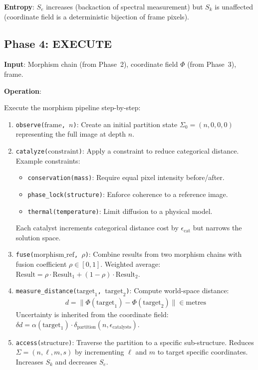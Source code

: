 \documentclass[11pt,twocolumn]{article}
\begin{document}
\textbf{Entropy}: $S_e$ increases (backaction of spectral measurement) but $S_k$ is unaffected (coordinate field is a deterministic bijection of frame pixels).

\subsection{Phase 4: EXECUTE}

\textbf{Input}: Morphism chain (from Phase~2), coordinate field $\Phi$ (from Phase~3), frame.

\textbf{Operation}:

Execute the morphism pipeline step-by-step:

\begin{enumerate}
\item \texttt{observe($\text{frame}$, $n$)}: Create an initial partition state $\Sigma_0 = (n, 0, 0, 0)$ representing the full image at depth $n$.
\item \texttt{catalyze($\text{constraint}$)}: Apply a constraint to reduce categorical distance. Example constraints:
  \begin{itemize}
  \item \texttt{conservation(mass)}: Require equal pixel intensity before/after.
  \item \texttt{phase\_lock(structure)}: Enforce coherence to a reference image.
  \item \texttt{thermal(temperature)}: Limit diffusion to a physical model.
  \end{itemize}
  Each catalyst increments categorical distance cost by $\epsilon_{\text{cat}}$ but narrows the solution space.

\item \texttt{fuse($\text{morphism\_ref}$, $\rho$)}: Combine results from two morphism chains with fusion coefficient $\rho \in [0, 1]$. Weighted average: $\text{Result} = \rho \cdot \text{Result}_1 + (1-\rho) \cdot \text{Result}_2$.

\item \texttt{measure\_distance($\text{target}_1$, $\text{target}_2$)}: Compute world-space distance:
\begin{align}
d = \|\Phi(\text{target}_1) - \Phi(\text{target}_2)\| \in \text{metres}
\end{align}
Uncertainty is inherited from the coordinate field: $\delta d = \alpha(\text{target}_1) \cdot \delta_{\text{partition}}(n, \epsilon_{\text{catalysts}})$.

\item \texttt{access($\text{structure}$)}: Traverse the partition to a specific sub-structure. Reduces $\Sigma = (n, \ell, m, s)$ by incrementing $\ell$ and $m$ to target specific coordinates. Increases $S_k$ and decreases $S_e$.
\end{enumerate}
\end{document}
